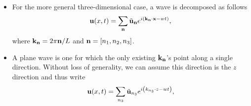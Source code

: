 \documentclass[11pt]{article}
\begin{document}
\begin{itemize}
\item For the more general three-dimensional case, a wave is decomposed as follows
\begin{equation}
    \label{eq:electrodynamics_3d_wave}
    \mathbf{u}(x,t) = \sum_{\mathbf{n}} \tilde{\mathbf{u}}_{\mathbf{n}} e^{i \left ( \mathbf{k}_{\mathbf{n}} \cdot \mathbf{x} - wt \right )},
\end{equation}
where $\mathbf{k}_{\mathbf{n}} = 2 \pi \mathbf{n} / L$ and $\mathbf{n} = [n_1, n_2, n_3]$.

\item A plane wave is one for which the only existing $\mathbf{k}_{\mathbf{n}}$'s point along a single direction. Without loss of generality, we can assume this direction is the $z$ direction and thus write
\begin{equation}
    \mathbf{u}(x,t) = \sum_{n_3} \tilde{\mathbf{u}}_{n_3} e^{i \left ( k_{n_3} \cdot z - wt \right )},
\end{equation}

\end{itemize}

\end{document}

